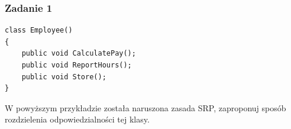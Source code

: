 \subsubsection{Zadanie 1}
\begin{lstlisting}[caption={Naruszenie zasady SRP}, label={lab1/lst/srpViolationEmployee}]
class Employee()
{
	public void CalculatePay();
	public void ReportHours();
	public void Store();
}
\end{lstlisting}
W powyższym przykładzie została naruszona zasada SRP, zaproponuj sposób rozdzielenia odpowiedzialności tej klasy. 


